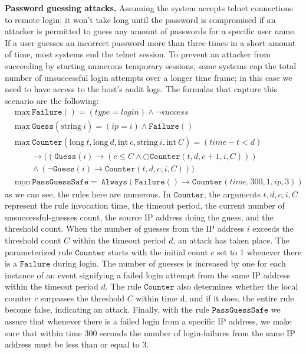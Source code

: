 \documentclass[english]{article}
\begin{document}
\textbf{Password guessing attacks.}
Assuming the system accepts telnet connections to remote login; it won't take long until the password is compromised if an attacker is permitted to guess any amount of passwords for a specific user name. If a user guesses an incorrect password more than three times in a short amount of time, most systems end the telnet session. To prevent an attacker from succeeding by starting numerous temporary sessions, some systems cap the total number of unsuccessful login attempts over a longer time frame; in this case we need to have access to the host's audit logs. The formulas that capture this scenario are the following:
\begin{align*}
    & \underline{\text{max}}\ \mathtt{Failure}() = (type=login)\land \neg success\\
    & \underline{\text{max}}\ \mathtt{Guess}(\underline{\text{string}}\ i) = (ip=i)\land \mathtt{Failure}()\\
    & \underline{\text{max}}\ \mathtt{Counter}(\underline{\text{long}}\ t, \underline{\text{long}}\ d, \underline{\text{int}}\ c,\underline{\text{string}}\ i,\underline{\text{int}}\ C) = (time-t<d)\\
    & \quad\quad\rightarrow((\mathtt{Guess}(i)\rightarrow(c\leq C\land \bigcirc\mathtt{Counter}(t,d,c+1,i,C)))  \\
    & \quad\quad\land(\neg \mathtt{Guess}(i)\rightarrow\mathtt{Counter}(t,d,c,i,C))) \\
    & \underline{\text{mon}}\ \mathtt{PassGuessSafe} =\ \mathtt{Always}(\mathtt{Failure}()\rightarrow\mathtt{Counter}(time,300,1,ip,3)) 
\end{align*}
as we can see, the rules here are numerous. In $\mathtt{Counter}$, the arguments $t, d, c, i, C$ represent the rule invocation time, the timeout period, the current number of unsuccessful-guesses count, the source IP address doing the guess, and the threshold count. When the number of guesses from the IP address $i$ exceeds the threshold count $C$ within the timeout period $d$, an attack has taken place. The parameterized rule $\mathtt{Counter}$ starts with the initial count $c$ set to 1 whenever there is a $\mathtt{Failure}$ during login. The number of guesses is increased by one for each instance of an event signifying a failed login attempt from the same IP address within the timeout period $d$. The rule $\mathtt{Counter}$ also determines whether the local counter $c$ surpasses the threshold $C$ within time d, and if it does, the entire rule become false, indicating an attack. Finally, with the rule $\mathtt{PassGuessSafe}$ we assure that whenever there is a failed login from a specific IP address, we make sure that within time $300$ seconds the number of login-failures from the same IP address must be less than or equal to $3$.
\end{document}
